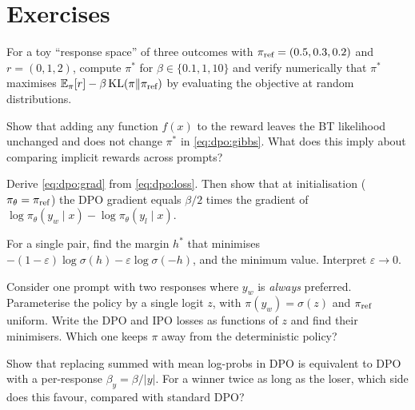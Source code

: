 \section{Exercises}\label{sec:dpo:exercises}

\begin{exercise}
For a toy ``response space'' of three outcomes with $\pi_{\text{ref}}=(0.5,0.3,0.2)$ and $r=(0,1,2)$,
compute $\pi^*$ for $\beta\in\{0.1,1,10\}$ and verify numerically that $\pi^*$ maximises
$\mathbb{E}_\pi[r]-\beta\operatorname{KL}(\pi\|\pi_{\text{ref}})$ by evaluating the objective at random distributions.
\end{exercise}

\begin{exercise}[Z cancels]
Show that adding any function $f(x)$ to the reward leaves the BT likelihood unchanged and does not
change $\pi^*$ in \eqref{eq:dpo:gibbs}. What does this imply about comparing implicit rewards across
prompts?
\end{exercise}

\begin{exercise}
Derive \eqref{eq:dpo:grad} from \eqref{eq:dpo:loss}. Then show that at initialisation
($\pi_\theta=\pi_{\text{ref}}$) the DPO gradient equals $\beta/2$ times the gradient of
$\log\pi_\theta(y_w\mid x)-\log\pi_\theta(y_l\mid x)$.
\end{exercise}

\begin{exercise}
For a single pair, find the margin $h^*$ that minimises
$-(1-\varepsilon)\log\sigma(h)-\varepsilon\log\sigma(-h)$, and the minimum value. Interpret
$\varepsilon\to0$.
\end{exercise}

\begin{exercise}
Consider one prompt with two responses where $y_w$ is \emph{always} preferred. Parameterise the
policy by a single logit $z$, with $\pi(y_w)=\sigma(z)$ and $\pi_{\text{ref}}$ uniform. Write the DPO and IPO
losses as functions of $z$ and find their minimisers. Which one keeps $\pi$ away from the
deterministic policy?
\end{exercise}

\begin{exercise}
Show that replacing summed with mean log-probs in DPO is equivalent to DPO with a
per-response $\beta_y=\beta/|y|$. For a winner twice as long as the loser, which side does this
favour, compared with standard DPO?
\end{exercise}

